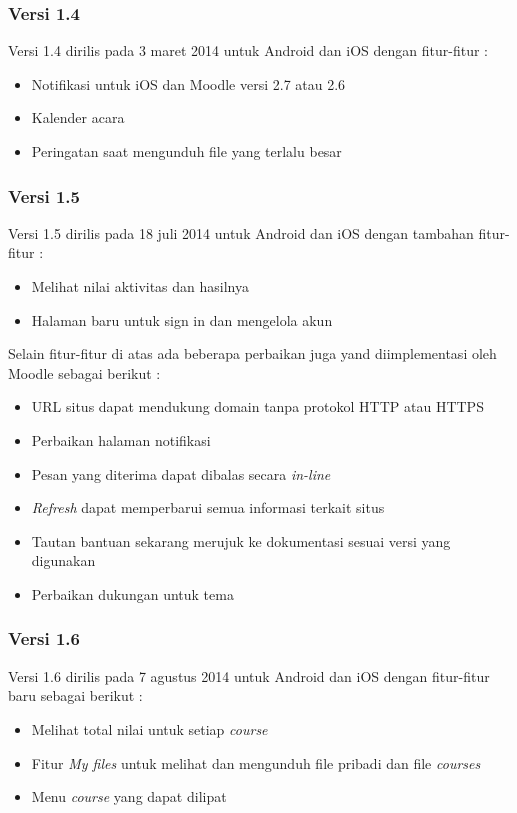 \subsubsection{Versi 1.4}
Versi 1.4 dirilis pada 3 maret 2014 untuk Android dan iOS dengan fitur-fitur : \cite{Moodlemobile:version1:intro}
	\begin{itemize}
		\item Notifikasi untuk iOS dan Moodle versi 2.7 atau 2.6
		\item Kalender acara
		\item Peringatan saat mengunduh file yang terlalu besar
	\end{itemize}

\subsubsection{Versi 1.5}
Versi 1.5 dirilis pada 18 juli 2014 untuk Android dan iOS dengan tambahan fitur-fitur : \cite{Moodlemobile:version1:intro}

	\begin{itemize}
		\item Melihat nilai aktivitas dan hasilnya
		\item Halaman baru untuk sign in dan mengelola akun
	\end{itemize}

Selain fitur-fitur di atas ada beberapa perbaikan juga yand diimplementasi oleh Moodle sebagai berikut :
	\begin{itemize}
		\item URL situs dapat mendukung domain tanpa protokol HTTP atau HTTPS
		\item Perbaikan halaman notifikasi
		\item Pesan yang diterima dapat dibalas secara \textit{in-line}
		\item \textit{Refresh} dapat memperbarui semua informasi terkait situs
		\item Tautan bantuan sekarang merujuk ke dokumentasi sesuai versi yang digunakan
		\item Perbaikan dukungan untuk tema
	\end{itemize}
	
\subsubsection{Versi 1.6}
Versi 1.6 dirilis pada 7 agustus 2014 untuk Android dan iOS dengan fitur-fitur baru sebagai berikut : \cite{Moodlemobile:version1:intro}
	\begin{itemize}
		\item Melihat total nilai untuk setiap \textit{course}
		\item Fitur \textit{My files} untuk melihat dan mengunduh file pribadi dan file \textit{courses}
		\item Menu \textit{course} yang dapat dilipat
	\end{itemize}

